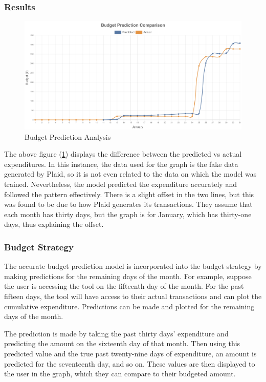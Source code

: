 \subsubsection{Results}
\begin{figure}[H]
	\centering
	\includegraphics[width=\textwidth]{images/budget_prediction_comparison.png}
	\caption{Budget Prediction Analysis}
	\label{fig:BudgetPredictionResults}
\end{figure}

The above figure (\ref{fig:BudgetPredictionResults}) displays the difference between the predicted vs actual expenditures. In this instance, the data used for the graph is the fake data generated by Plaid, so it is not even related to the data on which the model was trained. Nevertheless, the model predicted the expenditure accurately and followed the pattern effectively. There is a slight offset in the two lines, but this was found to be due to how Plaid generates its transactions. They assume that each month has thirty days, but the graph is for January, which has thirty-one days, thus explaining the offset.

\subsubsection{Budget Strategy}
The accurate budget prediction model is incorporated into the budget strategy by making predictions for the remaining days of the month. For example, suppose the user is accessing the tool on the fifteenth day of the month. For the past fifteen days, the tool will have access to their actual transactions and can plot the cumulative expenditure. Predictions can be made and plotted for the remaining days of the month.

The prediction is made by taking the past thirty days' expenditure and predicting the amount on the sixteenth day of that month. Then using this predicted value and the true past twenty-nine days of expenditure, an amount is predicted for the seventeenth day, and so on. These values are then displayed to the user in the graph, which they can compare to their budgeted amount.

